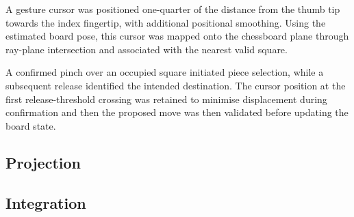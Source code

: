 A gesture cursor was positioned one-quarter of the distance from the thumb tip towards the index fingertip, with additional positional smoothing. Using the estimated board pose, this cursor was mapped onto the chessboard plane through ray-plane intersection and associated with the nearest valid square.

A confirmed pinch over an occupied square initiated piece selection, while a subsequent release identified the intended destination. The cursor position at the first release-threshold crossing was retained to minimise displacement during confirmation and then the proposed move was then validated before updating the board state.
\subsection{Projection}

\subsection{Integration}